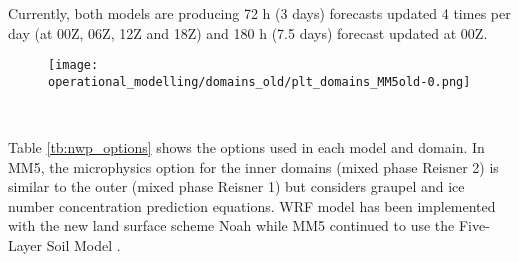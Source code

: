 Currently, both models are producing 72 h (3 days) forecasts updated 4 times per day (at 00Z, 06Z, 12Z and 18Z) and 180 h (7.5 days) forecast updated at 00Z.

\begin{figure}[!htp]
    \centering
     \texttt{[image: operational\_modelling/domains\_old/plt\_domains\_MM5old-0.png]}
    \label{fig:dom_mm5_old}
\end{figure}
\FloatBarrier

\begin{figure}[!htp]
    \centering
    \\
    \label{fig:doms}
\end{figure}
\FloatBarrier

Table \ref{tb:nwp_options} shows the options used in each model and domain. In MM5, the microphysics option for the inner domains (mixed phase Reisner 2) is similar to the outer (mixed phase Reisner 1) but considers graupel and ice number concentration prediction equations. WRF model has been implemented with the new land surface scheme Noah \citep{ChenDudhia2001} while MM5 continued to use the Five-Layer Soil Model \citep{Dudhia1996}. 



